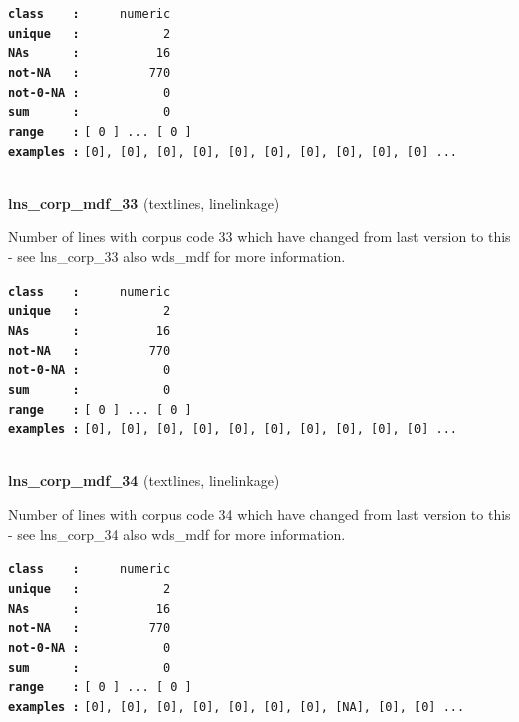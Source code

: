 \documentclass[]{article}
\begin{document}
\textbf{\texttt{class\ \ \ \ :}} \texttt{~~~~~numeric}\\
\textbf{\texttt{unique\ \ \ :}} \texttt{~~~~~~~~~~~2}\\
\textbf{\texttt{NAs\ \ \ \ \ \ :}} \texttt{~~~~~~~~~~16}\\
\textbf{\texttt{not-NA\ \ \ :}} \texttt{~~~~~~~~~770}\\
\textbf{\texttt{not-0-NA\ :}} \texttt{~~~~~~~~~~~0}\\
\textbf{\texttt{sum\ \ \ \ \ \ :}} \texttt{~~~~~~~~~~~0}\\
\textbf{\texttt{range\ \ \ \ :}}
\texttt{{[}\ 0\ {]}\ ...\ {[}\ 0\ {]}}\\
\textbf{\texttt{examples\ :}}
\texttt{{[}0{]},\ {[}0{]},\ {[}0{]},\ {[}0{]},\ {[}0{]},\ {[}0{]},\ {[}0{]},\ {[}0{]},\ {[}0{]},\ {[}0{]}\ ...}\\

~

\textbf{lns\_corp\_mdf\_33} (textlines, linelinkage)

Number of lines with corpus code 33 which have changed from last version
to this - see lns\_corp\_33 also wds\_mdf for more information.

\textbf{\texttt{class\ \ \ \ :}} \texttt{~~~~~numeric}\\
\textbf{\texttt{unique\ \ \ :}} \texttt{~~~~~~~~~~~2}\\
\textbf{\texttt{NAs\ \ \ \ \ \ :}} \texttt{~~~~~~~~~~16}\\
\textbf{\texttt{not-NA\ \ \ :}} \texttt{~~~~~~~~~770}\\
\textbf{\texttt{not-0-NA\ :}} \texttt{~~~~~~~~~~~0}\\
\textbf{\texttt{sum\ \ \ \ \ \ :}} \texttt{~~~~~~~~~~~0}\\
\textbf{\texttt{range\ \ \ \ :}}
\texttt{{[}\ 0\ {]}\ ...\ {[}\ 0\ {]}}\\
\textbf{\texttt{examples\ :}}
\texttt{{[}0{]},\ {[}0{]},\ {[}0{]},\ {[}0{]},\ {[}0{]},\ {[}0{]},\ {[}0{]},\ {[}0{]},\ {[}0{]},\ {[}0{]}\ ...}\\

~

\textbf{lns\_corp\_mdf\_34} (textlines, linelinkage)

Number of lines with corpus code 34 which have changed from last version
to this - see lns\_corp\_34 also wds\_mdf for more information.

\textbf{\texttt{class\ \ \ \ :}} \texttt{~~~~~numeric}\\
\textbf{\texttt{unique\ \ \ :}} \texttt{~~~~~~~~~~~2}\\
\textbf{\texttt{NAs\ \ \ \ \ \ :}} \texttt{~~~~~~~~~~16}\\
\textbf{\texttt{not-NA\ \ \ :}} \texttt{~~~~~~~~~770}\\
\textbf{\texttt{not-0-NA\ :}} \texttt{~~~~~~~~~~~0}\\
\textbf{\texttt{sum\ \ \ \ \ \ :}} \texttt{~~~~~~~~~~~0}\\
\textbf{\texttt{range\ \ \ \ :}}
\texttt{{[}\ 0\ {]}\ ...\ {[}\ 0\ {]}}\\
\textbf{\texttt{examples\ :}}
\texttt{{[}0{]},\ {[}0{]},\ {[}0{]},\ {[}0{]},\ {[}0{]},\ {[}0{]},\ {[}0{]},\ {[}NA{]},\ {[}0{]},\ {[}0{]}\ ...}\\
\end{document}

